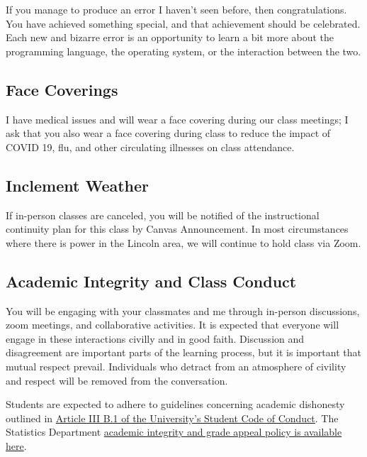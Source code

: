 \documentclass[
  11pt,
  letterpaper,
  DIV=11,
  numbers=noendperiod]{scrartcl}
\begin{document}
If you manage to produce an error I haven't seen before, then
congratulations. You have achieved something special, and that
achievement should be celebrated. Each new and bizarre error is an
opportunity to learn a bit more about the programming language, the
operating system, or the interaction between the two.

\hypertarget{face-coverings}{%
\subsection{Face Coverings}\label{face-coverings}}

I have medical issues and will wear a face covering during our class
meetings; I ask that you also wear a face covering during class to
reduce the impact of COVID 19, flu, and other circulating illnesses on
class attendance.

\hypertarget{inclement-weather}{%
\subsection{Inclement Weather}\label{inclement-weather}}

If in-person classes are canceled, you will be notified of the
instructional continuity plan for this class by Canvas Announcement. In
most circumstances where there is power in the Lincoln area, we will
continue to hold class via Zoom.

\hypertarget{academic-integrity-and-class-conduct}{%
\subsection{Academic Integrity and Class
Conduct}\label{academic-integrity-and-class-conduct}}

You will be engaging with your classmates and me through in-person
discussions, zoom meetings, and collaborative activities. It is expected
that everyone will engage in these interactions civilly and in good
faith. Discussion and disagreement are important parts of the learning
process, but it is important that mutual respect prevail. Individuals
who detract from an atmosphere of civility and respect will be removed
from the conversation.

Students are expected to adhere to guidelines concerning academic
dishonesty outlined in \href{http://stuafs.unl.edu/dos/code}{Article III
B.1 of the University's Student Code of Conduct}. The Statistics
Department
\href{https://statistics.unl.edu/grade-appeals-and-academic-integrity-policy}{academic
integrity and grade appeal policy is available here}.
\end{document}
